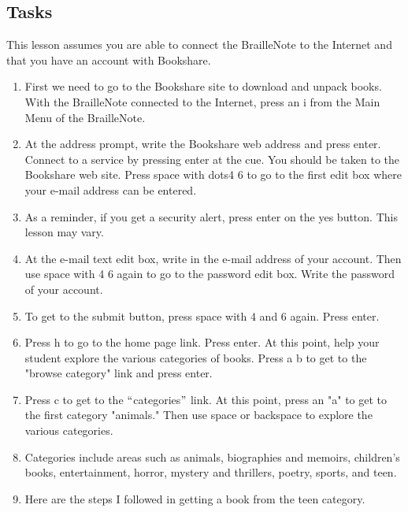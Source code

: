 \documentclass[10pt,letterpaper,twoside]{report}
\begin{document}
{{{{ \subsection{Tasks}



This lesson assumes you are able to connect the BrailleNote to the Internet and that you have an account with Bookshare.



\begin{enumerate}
	\item First we need to go to the Bookshare site to download and unpack books. With the BrailleNote connected to the Internet, press an i from the Main Menu of the BrailleNote.
	      
	\item At the address prompt, write the Bookshare web address and press enter.  Connect to a service by pressing enter at the cue.  You should be taken to the Bookshare web site.  Press space with dots4 6 to go to the first edit box where your e-mail address can be entered.
	      
	\item As a reminder, if you get a security alert, press enter on the yes button.  This lesson may vary.
	      
	\item At the e-mail text edit box, write in the e-mail address of your account.  Then use space with 4 6 again to go to the password edit box.  Write the password of your account.
	      
	\item To get to the submit button, press space with 4 and 6 again.  Press enter.
	      
	\item Press h to go to the home page link.  Press enter.  At this point, help your student explore the various categories of books.  Press a b to get to the "browse category" link and press enter.
	      
	\item Press c to get to the $``$categories$"$  link. At this point, press an "a" to get to the first category "animals." Then use space or backspace to explore the various categories.
	      
	\item Categories include areas such as animals, biographies and memoirs, children's books, entertainment, horror, mystery and thrillers, poetry, sports, and teen.
	      
	\item Here are the steps I followed in getting a book from the teen category.
	      

\end{enumerate}}}}}
\end{document}
